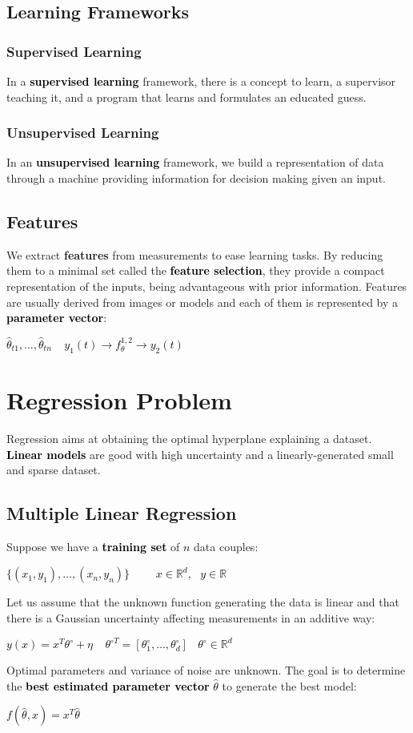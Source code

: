 \documentclass{article}
\newcommand{\bb}[1]{\textcolor{black}{\textbf{#1}}}
\newcommand{\rr}[1]{\textcolor{black}{#1}}
\newcommand{\cc}[1]{\begin{center}\textcolor{black}{#1}\end{center}}
\begin{document}
\subsection{Learning Frameworks}
\subsubsection{Supervised Learning}
In a \bb{supervised learning} framework, there is a concept to learn, a supervisor teaching it, and a program that learns and formulates an educated guess.
\subsubsection{Unsupervised Learning}
In an \bb{unsupervised learning} framework, we build a representation of data through a machine providing information for decision making given an input.

\subsection{Features}
We extract \textbf{features} from measurements to ease learning tasks. By reducing them to a minimal set called the \bb{feature selection}, they provide a compact representation of the inputs, being advantageous with prior information. Features are usually derived from images or models and each of them is represented by a \bb{parameter vector}:
\cc{$\hat{\theta}_{t1}, \dots, \hat{\theta}_{tn}\ \ \ \ \ y_1(t) \rightarrow f^{1,2}_\theta \rightarrow y_2(t)$}

\newpage

\section{Regression Problem}
Regression aims at obtaining the optimal hyperplane explaining a dataset. \bb{Linear models} are good with high uncertainty and a linearly-generated small and sparse dataset.

\subsection{Multiple Linear Regression}
Suppose we have a \bb{training set} of \rr{$n$} data couples:
\cc{$\{(x_1,y_1), \dots, (x_n, y_n)\}$ \ \ \ \ $x \in \mathbb{R}^d$, \ $y \in \mathbb{R}$}
Let us assume that the unknown function generating the data is linear and that there is a Gaussian uncertainty affecting measurements in an additive way:
\cc{$y(x) = x^T\theta^\circ + \eta \ \ \ \ \ \theta^{\circ T} = [\theta^\circ_1, \dots,\theta^\circ_d]\ \ \ \ \theta^\circ \in \mathbb{R}^d$}
Optimal parameters and variance of noise are unknown. The goal is to determine the \bb{best estimated parameter vector} \rr{$\hat{\theta}$} to generate the best model:
\cc{$f(\hat{\theta},x) = x^T\hat{\theta}$}
\end{document}
